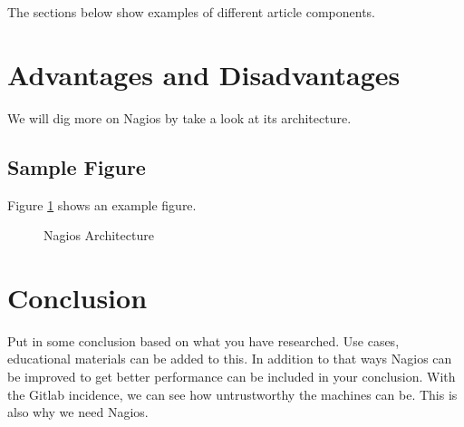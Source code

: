 \documentclass[9pt,twocolumn,twoside]{styles/osajnl}
\begin{document}
\label{sec:examples}

The sections below show examples of different article components.

\section{Advantages and Disadvantages}

We will dig more on Nagios by take a look at its architecture.

\subsection{Sample Figure}

Figure \ref{fig:nagios-architecture} shows an example figure.

\begin{figure}[htbp]
\centering
{}
\caption{Nagios Architecture}
\label{fig:nagios-architecture}
\end{figure}



\section{Conclusion}
Put in some conclusion based on what you have researched.  Use cases,
educational materials can be added to this.  In addition to that ways
Nagios can be improved to get better performance can be included in
your conclusion. With the Gitlab incidence, we can see how
untrustworthy the machines can be. This is also why we need Nagios.





 

\appendix
\end{document}
